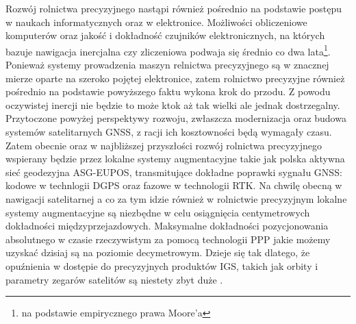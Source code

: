\indent	Rozwój rolnictwa precyzyjnego nastąpi również pośrednio na podstawie postępu w naukach informatycznych oraz w elektronice. Możliwości 
obliczeniowe komputerów oraz jakość i dokładność czujników elektronicznych, na których bazuje nawigacja inercjalna czy zliczeniowa podwaja się średnio co dwa lata\footnote{
na podstawie empirycznego prawa Moore'a}. Ponieważ systemy prowadzenia maszyn relnictwa precyzyjnego są w znacznej mierze oparte na szeroko pojętej elektronice, zatem 
rolnictwo precyzyjne również pośrednio na podstawie powyższego faktu wykona krok do przodu. Z powodu oczywistej inercji nie będzie to może ktok aż tak wielki ale jednak
dostrzegalny.\newline
\indent Przytoczone powyżej perspektywy rozwoju, zwłaszcza modernizacja oraz budowa systemów satelitarnych GNSS, z racji ich kosztowności będą wymagały 
czasu. Zatem obecnie oraz w najbliższej przyszłości rozwój rolnictwa precyzyjnego wspierany będzie przez lokalne systemy augmentacyjne takie jak polska 
aktywna sieć geodezyjna ASG-EUPOS, transmitujące dokładne poprawki sygnału GNSS: kodowe w technlogii DGPS oraz fazowe w technologii RTK.
Na chwilę obecną w nawigacji satelitarnej a co za tym idzie również w rolnictwie precyzyjnym lokalne systemy augmentacyjne są niezbędne w celu osiągnięcia 
centymetrowych dokładności międzyprzejazdowych. Maksymalne dokładności pozycjonowania absolutnego w czasie rzeczywistym za pomocą technologii PPP jakie możemy
uzyskać dzisiaj są na poziomie decymetrowym. Dzieje się tak dlatego, że opuźnienia w dostępie do precyzyjnych produktów IGS, takich jak orbity i parametry 
zegarów satelitów są niestety zbyt duże \cite[][strona 215]{ggos}.

